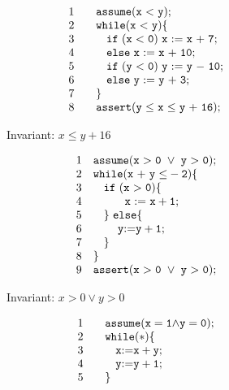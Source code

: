 \begin{figure}[t]
\begin{subfigure}{0.5\textwidth}
    \raggedright
\[
 \begin{array}{ll}
1 & \code{~~~ assume(x~{<}~y);}  \\
2 & \code{~~~ while(x~{<}~y)\{}  \\
3 & \code{~~~ \quad if~(x~{<}~0)~x~{:=}~x~{+}~7;}  \\
4 & \code{~~~ \quad else~ x~{:=}~x~{+}~10;}\\
5 & \code{~~~ \quad if~(y~{<}~0)~y~{:=}~y~{-}~10;} \\
6 & \code{~~~ \quad else~ y~{:=}~y~{+}~3;}\\
7 & \code{~~~\}} \\
8 & \code{~~~assert(y~{\leq}~x~{\leq}~y~{+}~16);}
\end{array}
\]
    \caption{Invariant: $x \le y + 16$}
\end{subfigure}%
\begin{subfigure}{.5\textwidth}
        \[
      \begin{array}{ll}
      1 & \code{assume(x~{>}~0~\lor~y~{>}~0);}  \\
      2 & \code{while(x~{+}~y~{\le}-2)\{}  \\
      3 & \code{\quad if~(x~{>}~0) \{}  \\
      4 & \code{\quad \quad ~~~x~{:=}~x+1;}  \\
      5 & \code{\quad \}~else \{} \\
      6 & \code{\quad \quad ~y {:=} y + 1;}\\
      7 & \code{\quad \}} \\
      8 & \code{\}} \\
      9 & \code{assert(x~{>}~0~ \lor ~y~{>}~0);}\\
      \end{array}
    \]
    \caption{Invariant: $x > 0 \lor y > 0$}
\end{subfigure}
   \begin{subfigure}{0.5\textwidth}
    \raggedright
     \vspace{0.3cm}
\[
 \begin{array}{ll}
1 & \code{~~~ assume(x=1 {\land} y=0);}  \\
2 & \code{~~~ while(*)\{}  \\
3 & \code{~~~ \quad x {:=} x + y;}  \\
4 & \code{~~~ \quad y {:=} y + 1;}\\
5 & \code{~~~\}} \\

\end{array}\]
\end{subfigure}
\end{figure}
